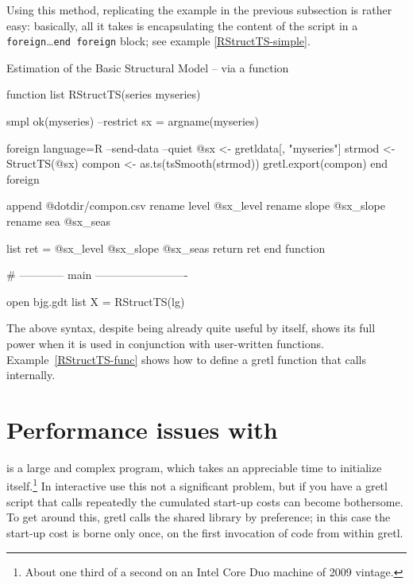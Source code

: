 Using this method, replicating the example in the previous subsection
is rather easy: basically, all it takes is encapsulating the content
of the  script in a \texttt{foreign}\ldots\texttt{end foreign}
block; see example \ref{RStructTS-simple}.

\begin{script}[htbp]
  \caption{Estimation of the Basic Structural Model -- via a function}
\begin{scode}
function list RStructTS(series myseries)

    smpl ok(myseries) --restrict
    sx = argname(myseries)

    foreign language=R --send-data --quiet
        @sx <- gretldata[, "myseries"]
        strmod <- StructTS(@sx)
        compon <- as.ts(tsSmooth(strmod))
        gretl.export(compon)
    end foreign

    append @dotdir/compon.csv
    rename level @sx_level
    rename slope @sx_slope
    rename sea @sx_seas

    list ret = @sx_level @sx_slope @sx_seas
    return ret
end function

# ------------ main -------------------------

open bjg.gdt
list X = RStructTS(lg)
\end{scode}

\label{RStructTS-func}
\end{script}

The above syntax, despite being already quite useful by itself, shows
its full power when it is used in conjunction with user-written
functions.  Example~\ref{RStructTS-func} shows how to define a
gretl function that calls  internally.

\section{Performance issues with }
\label{sec:R-performance}

 is a large and complex program, which takes an appreciable
time to initialize itself.\footnote{About one third of a second on an
  Intel Core Duo machine of 2009 vintage.}  In interactive use this
not a significant problem, but if you have a gretl script that
calls  repeatedly the cumulated start-up costs can become
bothersome.  To get around this, gretl calls the  shared
library by preference; in this case the start-up cost is borne only
once, on the first invocation of  code from within gretl.

